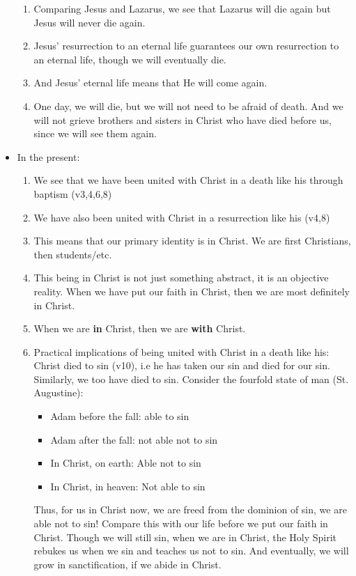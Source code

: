 \begin{itemize}
{\begin{enumerate}
    \item{Comparing Jesus and Lazarus, we see that Lazarus will die again but Jesus will never die again.}
    \item{Jesus’ resurrection to an eternal life guarantees our own resurrection to an eternal life, though we will eventually die.}
    \item{And Jesus’ eternal life means that He will come again.}
    \item{One day, we will die, but we will not need to be afraid of death. And we will not grieve brothers and sisters in Christ who have died before us, since we will see them again.}
  \end{enumerate}}
  \item{In the present: 
  \begin{enumerate}
    \item{We see that we have been united with Christ in a death like his through baptism (v3,4,6,8)}
    \item{We have also been united with Christ in a resurrection like his (v4,8)}
    \item{This means that our primary identity is in Christ. We are first Christians, then students/etc.}
    \item{This being in Christ is not just something abstract, it is an objective reality. When we have put our faith in Christ, then we are most definitely in Christ. }
    \item{When we are \textbf{in} Christ, then we are \textbf{with} Christ.}
    \item{Practical implications of being united with Christ in a death like his: Christ died to sin (v10), i.e he has taken our sin and died for our sin. Similarly, we too have died to sin. Consider the fourfold state of man (St. Augustine):
    \begin{itemize}
      \item{Adam before the fall: able to sin}
      \item{Adam after the fall: not able not to sin}
      \item{In Christ, on earth: Able not to sin}
      \item{In Christ, in heaven: Not able to sin}
    \end{itemize}
    Thus, for us in Christ now, we are freed from the dominion of sin, we are able not to sin! Compare this with our life before we put our faith in Christ. Though we will still sin, when we are in Christ, the Holy Spirit rebukes us when we sin and teaches us not to sin. And eventually, we will grow in sanctification, if we abide in Christ.}

\end{enumerate}}
\end{itemize}
